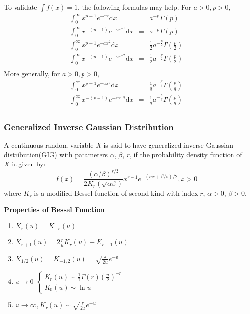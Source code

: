 \documentclass[11pt]{article}
\begin{document}
To validate $\int{f(x)}=1$, the following formulas may help. For $a>0, p>0$,
\begin{eqnarray*}
\int_{0}^{\infty}x^{p-1}e^{-ax}\mathrm dx &=& a^{-p}\Gamma(p) \\
\int_{0}^{\infty}x^{-(p+1)}e^{-ax^{-1}}\mathrm dx &=& a^{-p}\Gamma(p) \\
\int_{0}^{\infty}x^{p-1}e^{-ax^2}\mathrm dx &=& \frac{1}{2}a^{-\frac{p}{2}}\Gamma(\frac{p}{2}) \\
\int_{0}^{\infty}x^{-(p+1)}e^{-ax^{-2}}\mathrm dx &=& \frac{1}{2}a^{-\frac{p}{2}}\Gamma(\frac{p}{2}) \\
\end{eqnarray*}
More generally, for $a>0, p>0$,
\begin{eqnarray*}
\int_{0}^{\infty}x^{p-1}e^{-ax^q}\mathrm dx &=& \frac{1}{q}a^{-\frac{p}{q}}\Gamma(\frac{p}{q}) \\
\int_{0}^{\infty}x^{-(p+1)}e^{-ax^{-q}}\mathrm dx &=& \frac{1}{q}a^{-\frac{p}{q}}\Gamma(\frac{p}{q}) \\
\end{eqnarray*}
\subsubsection{Generalized Inverse Gaussian Distribution}
A continuous random variable $X$ is said to have generalized inverse Gaussian distribution(GIG) with parameters $\alpha$, $\beta$, $r$, if the probability density function of $X$ is given by:
\[f(x) = \frac{(\alpha / \beta)^{r/2}}{2 K_r(\sqrt{\alpha\beta})} x^{r-1} e^{-(\alpha x + \beta/x)/2}, x > 0\]
where $K_r$ is a modified Bessel function of second kind with index $r$, $\alpha > 0$, $\beta > 0$.

\textbf{Properties of Bessel Function}
\begin{enumerate}[(1)]
\item
$K_r(u)=K_{-r}(u)$
\item
$K_{r+1}(u)=2\frac{r}{u}K_{r}(u)+K_{r-1}(u)$
\item
$K_{1/2}(u)=K_{-1/2}(u)=\sqrt{\frac{\pi}{2u}}e^{-u}$
\item
$u\rightarrow0 \,\, \begin{cases}
  K_r(u) \sim \frac{1}{2}\Gamma(r)\left(\frac{u}{2}\right)^{-r} \\
  K_0(u) \sim \ln{u}
  \end{cases}$
\item
$u\rightarrow\infty, K_r(u)\sim\sqrt{\frac{\pi}{2u}}e^{-u}$
\end{enumerate}
\end{document}
